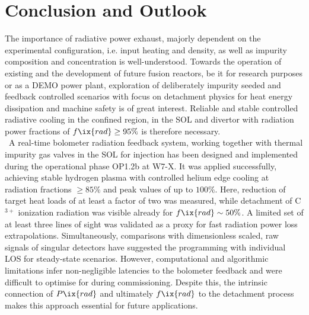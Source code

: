 %
\chapter{Conclusion and Outlook}\label{chap:conclusion}%
%
    The importance of radiative power exhaust, majorly dependent on the experimental configuration, i.e. input heating and density, as well as impurity composition and concentration is well-understood. Towards the operation of existing and the development of future fusion reactors, be it for research purposes or as a DEMO power plant, exploration of deliberately impurity seeded  and feedback controlled scenarios with focus on detachment physics for heat energy dissipation and machine safety is of great interest. Reliable and stable controlled radiative cooling in the confined region, in the SOL and divertor with radiation power fractions of $f\ix{rad}\ge95\%$ is therefore necessary.\\%
%
    \,\newline%
    A real-time bolometer radiation feedback system, working together with thermal impurity gas valves in the SOL for injection has been designed and implemented during the operational phase OP1.2b at W7-X. It was applied successfully, achieving stable hydrogen plasma with controlled helium edge cooling at radiation fractions $\ge85\%$ and peak values of up to $100\%$. Here, reduction of target heat loads of at least a factor of two was measured, while detachment of C$^{3+}$ ionization radiation was visible already for $f\ix{rad}\sim50\%$. A limited set of at least three lines of sight was validated as a proxy for fast radiation power loss extrapolations. Simultaneously, comparisons with dimensionless scaled, raw signals of singular detectors have suggested the programming with individual LOS for steady-state scenarios. However, computational and algorithmic limitations infer non-negligible latencies to the bolometer feedback and were difficult to optimise for during commissioning. Despite this, the intrinsic connection of $P\ix{rad}$ and ultimately $f\ix{rad}$ to the detachment process makes this approach essential for future applications.\\%
%
    \,\newline%
